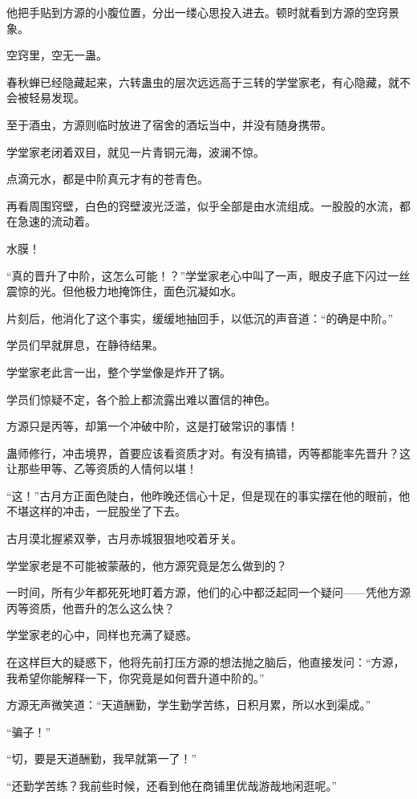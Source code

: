 \begin{this_body}
他把手贴到方源的小腹位置，分出一缕心思投入进去。顿时就看到方源的空窍景象。

空窍里，空无一蛊。

春秋蝉已经隐藏起来，六转蛊虫的层次远远高于三转的学堂家老，有心隐藏，就不会被轻易发现。

至于酒虫，方源则临时放进了宿舍的酒坛当中，并没有随身携带。

学堂家老闭着双目，就见一片青铜元海，波澜不惊。

点滴元水，都是中阶真元才有的苍青色。

再看周围窍壁，白色的窍壁波光泛滥，似乎全部是由水流组成。一股股的水流，都在急速的流动着。

水膜！

“真的晋升了中阶，这怎么可能！？”学堂家老心中叫了一声，眼皮子底下闪过一丝震惊的光。但他极力地掩饰住，面色沉凝如水。

片刻后，他消化了这个事实，缓缓地抽回手，以低沉的声音道：“的确是中阶。”

学员们早就屏息，在静待结果。

学堂家老此言一出，整个学堂像是炸开了锅。

学员们惊疑不定，各个脸上都流露出难以置信的神色。

方源只是丙等，却第一个冲破中阶，这是打破常识的事情！

蛊师修行，冲击境界，首要应该看资质才对。有没有搞错，丙等都能率先晋升？这让那些甲等、乙等资质的人情何以堪！

“这！”古月方正面色陡白，他昨晚还信心十足，但是现在的事实摆在他的眼前，他不堪这样的冲击，一屁股坐了下去。

古月漠北握紧双拳，古月赤城狠狠地咬着牙关。

学堂家老是不可能被蒙蔽的，他方源究竟是怎么做到的？

一时间，所有少年都死死地盯着方源，他们的心中都泛起同一个疑问——凭他方源丙等资质，他晋升的怎么这么快？

学堂家老的心中，同样也充满了疑惑。

在这样巨大的疑惑下，他将先前打压方源的想法抛之脑后，他直接发问：“方源，我希望你能解释一下，你究竟是如何晋升道中阶的。”

方源无声微笑道：“天道酬勤，学生勤学苦练，日积月累，所以水到渠成。”

“骗子！”

“切，要是天道酬勤，我早就第一了！”

“还勤学苦练？我前些时候，还看到他在商铺里优哉游哉地闲逛呢。”


\end{this_body}
